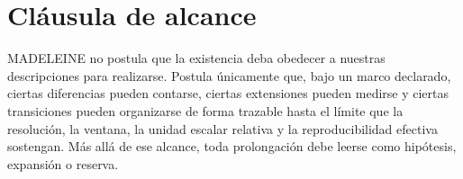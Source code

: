 \section{Cláusula de alcance}
\begin{observation}
MADELEINE no postula que la existencia deba obedecer a nuestras descripciones para realizarse. Postula únicamente que, bajo un marco declarado, ciertas diferencias pueden contarse, ciertas extensiones pueden medirse y ciertas transiciones pueden organizarse de forma trazable hasta el límite que la resolución, la ventana, la unidad escalar relativa y la reproducibilidad efectiva sostengan. Más allá de ese alcance, toda prolongación debe leerse como hipótesis, expansión o reserva.
\end{observation}

